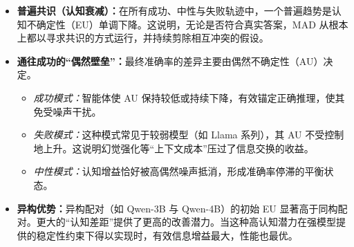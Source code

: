 \documentclass{article}
\theoremstyle{plain}
\theoremstyle{definition}
\theoremstyle{remark}
\begin{document}
\begin{itemize} \item \textbf{普遍共识（认知衰减）：}在所有成功、中性与失败轨迹中，一个普遍趋势是认知不确定性（EU）单调下降。这说明，无论是否符合真实答案，MAD 从根本上都以寻求共识的方式运行，并持续剪除相互冲突的假设。

\item \textbf{通往成功的“偶然壁垒”：}最终准确率的差异主要由偶然不确定性（AU）决定。
\begin{itemize}
    \item \textit{成功模式：}智能体使 AU 保持较低或持续下降，有效锚定正确推理，使其免受噪声干扰。
    \item \textit{失败模式：}这种模式常见于较弱模型（如 Llama 系列），其 AU 不受控制地上升。这说明幻觉强化等“上下文成本”压过了信息交换的收益。
    \item \textit{中性模式：}认知增益恰好被高偶然噪声抵消，形成准确率停滞的平衡状态。
\end{itemize}

\item \textbf{异构优势：}异构配对（如 Qwen-3B 与 Qwen-4B）的初始 EU 显著高于同构配对。更大的“认知差距”提供了更高的改善潜力。当这种高认知潜力在强模型提供的稳定性约束下得以实现时，有效信息增益最大，性能也最优。

\end{itemize}
\end{document}
